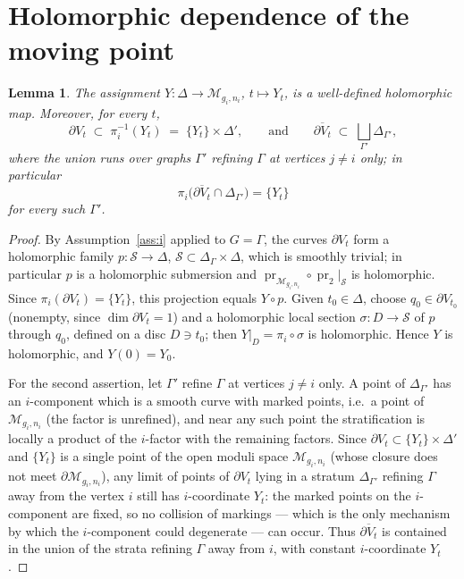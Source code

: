\documentclass[11pt]{amsart}
\newtheorem{lemma}[theorem]{Lemma}
\theoremstyle{definition}
\theoremstyle{remark}
\newcommand{\M}{\mathcal{M}}
\begin{document}
\section{Holomorphic dependence of the moving point}

\begin{lemma}\label{lem:hol}
The assignment $Y:\Delta\to \M_{g_i,n_i}$, $t\mapsto Y_t$, is a well-defined
holomorphic map. Moreover, for every $t$,
\[
\partial V_t\;\subset\; \pi_i^{-1}(Y_t)\;=\;\{Y_t\}\times\Delta',
\qquad\text{and}\qquad
\overline{\partial V_t}\;\subset\;\bigsqcup_{\Gamma'}\Delta_{\Gamma'},
\]
where the union runs over graphs $\Gamma'$ refining $\Gamma$ at vertices
$j\neq i$ only; in particular
\[
\pi_i\big(\overline{\partial V_t}\cap\Delta_{\Gamma'}\big)=\{Y_t\}
\]
for every such $\Gamma'$.
\end{lemma}

\begin{proof}
By Assumption~\ref{ass:i} applied to $G=\Gamma$, the curves
$\partial V_t$ form a holomorphic family $p:\mathcal{S}\to\Delta$,
$\mathcal{S}\subset\Delta_\Gamma\times\Delta$, which is smoothly trivial;
in particular $p$ is a holomorphic submersion and
$\operatorname{pr}_{\M_{g_i,n_i}}\circ\operatorname{pr}_2|_{\mathcal{S}}$
is holomorphic. Since $\pi_i(\partial V_t)=\{Y_t\}$, this projection equals
$Y\circ p$. Given $t_0\in\Delta$, choose $q_0\in\partial V_{t_0}$ (nonempty,
since $\dim\partial V_t=1$) and a holomorphic local section
$\sigma:D\to\mathcal{S}$ of $p$ through $q_0$, defined on a disc
$D\ni t_0$; then $Y|_D=\pi_i\circ\sigma$ is holomorphic. Hence $Y$ is
holomorphic, and $Y(0)=Y_0$.

For the second assertion, let $\Gamma'$ refine $\Gamma$ at vertices $j\ne i$
only. A point of $\Delta_{\Gamma'}$ has an $i$-component which is a smooth
curve with marked points, i.e.\ a point of $\M_{g_i,n_i}$ (the factor is
unrefined), and near any such point the stratification is locally a product
of the $i$-factor with the remaining factors. Since
$\partial V_t\subset\{Y_t\}\times\Delta'$ and $\{Y_t\}$ is a single point
of the open moduli space $\M_{g_i,n_i}$ (whose closure does not meet
$\partial\M_{g_i,n_i}$), any limit of points of $\partial V_t$ lying in a
stratum $\Delta_{\Gamma'}$ refining $\Gamma$ away from the vertex $i$ still
has $i$-coordinate $Y_t$: the marked points on the $i$-component are fixed,
so no collision of markings --- which is the only mechanism by which the
$i$-component could degenerate --- can occur. Thus
$\overline{\partial V_t}$ is contained in the union of the strata
refining $\Gamma$ away from $i$, with constant $i$-coordinate $Y_t$.
\end{proof}
\end{document}
